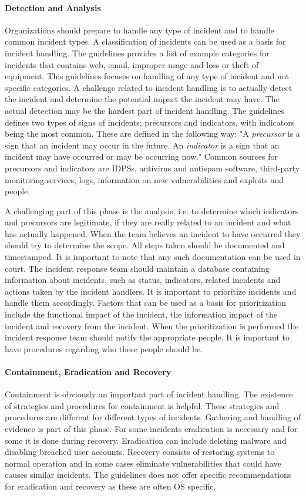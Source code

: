 \paragraph{Detection and Analysis}
Organizations should prepare to handle any type of incident and to handle common incident types. A classification of incidents can be used as a basis for incident handling. The guidelines provides a list of example categories for incidents that contains web, email, improper usage and loss or theft of equipment. This guidelines focuses on handling of any type of incident and not specific categories. A challenge related to incident handling is to actually detect the incident and determine the potential impact the incident may have. The actual detection may be the hardest part of incident handling. The guidelines defines two types of signs of incidents; precursors and indicators, with indicators being the most common. These are defined in the following way: "A \emph{precursor} is a sign that an incident may occur in the future. An \emph{indicator} is a sign that an incident may have occurred or may be occurring now." Common sources for precursors and indicators are \acp{IDPS}, antivirus and antispam software, third-party monitoring services, logs, information on new vulnerabilities and exploits and people. 

A challenging part of this phase is the analysis, i.e. to determine which indicators and precursors are legitimate, if they are really related to an incident and what has actually happened. When the team believes an incident to have occurred they should try to determine the scope. All steps taken should be documented and timestamped. It is important to note that any such documentation can be used in court. The incident response team should maintain a database containing information about incidents, such as status, indicators, related incidents and actions taken by the incident handlers. It is important to prioritize incidents and handle them accordingly. Factors that can be used as a basis for prioritization include the functional impact of the incident, the information impact of the incident and recovery from the incident. When the prioritization is performed the incident response team should notify the appropriate people. It is important to have procedures regarding who these people should be.

\paragraph{Containment, Eradication and Recovery}
Containment is obviously an important part of incident handling. The existence of strategies and procedures for containment is helpful. These strategies and procedures are different for different types of incidents. Gathering and handling of evidence is part of this phase. For some incidents eradication is necessary and for some it is done during recovery. Eradication can include deleting malware and disabling breached user accounts. Recovery consists of restoring systems to normal operation and in some cases eliminate vulnerabilities that could have causes similar incidents. The guidelines does not offer specific recommendations for eradication and recovery as these are often OS specific. 

